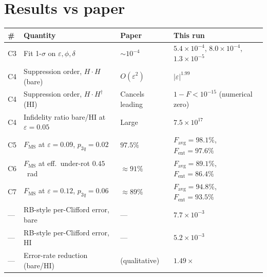 \documentclass[11pt]{article}
\begin{document}
\section{Results vs paper}
\begin{tabular}{p{0.6cm} p{6.5cm} p{3.5cm} p{2.5cm}}
\toprule
\# & Quantity & Paper & This run \\ \midrule
C3 & Fit 1-\(\sigma\) on \(\varepsilon,\phi,\delta\) & \(\sim 10^{-4}\) & \(5.4\times 10^{-4}\), \(8.0\times 10^{-4}\), \(1.3\times 10^{-5}\) \\
C4 & Suppression order, \(H\cdot H\) (bare) & \(O(\varepsilon^2)\) & \(|\varepsilon|^{1.99}\) \\
C4 & Suppression order, \(H\cdot H^{\dagger}\) (HI) & Cancels leading & \(1-F<10^{-15}\) (numerical zero) \\
C4 & Infidelity ratio bare/HI at \(\varepsilon=0.05\) & Large & \(7.5\times 10^{17}\) \\
C5 & \(F_{\text{MS}}\) at \(\varepsilon=0.09\), \(p_{2q}=0.02\) & \(97.5\%\) & \(F_{\text{avg}}=98.1\%\), \(F_{\text{ent}}=97.6\%\) \\
C6 & \(F_{\text{MS}}\) at eff.\ under-rot \(0.45\)~rad & \(\approx 91\%\) & \(F_{\text{avg}}=89.1\%\), \(F_{\text{ent}}=86.4\%\) \\
C7 & \(F_{\text{MS}}\) at \(\varepsilon=0.12\), \(p_{2q}=0.06\) & \(\approx 89\%\) & \(F_{\text{avg}}=94.8\%\), \(F_{\text{ent}}=93.5\%\) \\
--- & RB-style per-Clifford error, bare & --- & \(7.7\times 10^{-3}\) \\
--- & RB-style per-Clifford error, HI  & --- & \(5.2\times 10^{-3}\) \\
--- & Error-rate reduction (bare/HI)   & (qualitative) & \(1.49\times\) \\ \bottomrule
\end{tabular}
\end{document}
